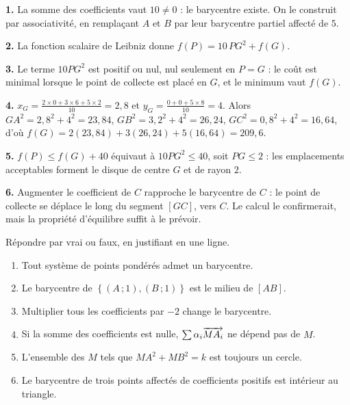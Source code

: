 \begin{corrige}
\textbf{1.} La somme des coefficients vaut $10 \neq 0$ : le barycentre existe.
On le construit par associativité, en remplaçant $A$ et $B$ par leur
barycentre partiel affecté de $5$.

\textbf{2.} La fonction scalaire de Leibniz donne
$f(P) = 10\,PG^{2}+f(G)$.

\textbf{3.} Le terme $10PG^{2}$ est positif ou nul, nul seulement en $P = G$ :
le coût est minimal lorsque le point de collecte est placé en $G$, et le
minimum vaut $f(G)$.

\textbf{4.} $x_{G} = \frac{2 \times 0+3 \times 6+5 \times 2}{10} = 2{,}8$ et
$y_{G} = \frac{0+0+5 \times 8}{10} = 4$. Alors
$GA^{2} = 2{,}8^{2}+4^{2} = 23{,}84$,
$GB^{2} = 3{,}2^{2}+4^{2} = 26{,}24$,
$GC^{2} = 0{,}8^{2}+4^{2} = 16{,}64$, d'où
$f(G) = 2(23{,}84)+3(26{,}24)+5(16{,}64) = 209{,}6$.

\textbf{5.} $f(P) \leq f(G)+40$ équivaut à $10PG^{2} \leq 40$, soit
$PG \leq 2$ : les emplacements acceptables forment le disque de centre $G$ et
de rayon $2$.

\textbf{6.} Augmenter le coefficient de $C$ rapproche le barycentre de $C$ :
le point de collecte se déplace le long du segment $[GC]$, vers $C$. Le
calcul le confirmerait, mais la propriété d'équilibre suffit à le prévoir.
\end{corrige}

\begin{jemeteste}
Répondre par vrai ou faux, en justifiant en une ligne.

\begin{enumerate}[label=\textbf{\arabic*.}, leftmargin=*, itemsep=0.28em]
  \item Tout système de points pondérés admet un barycentre.
  \item Le barycentre de $\left\{(A\,;1),(B\,;1)\right\}$ est le milieu de
        $[AB]$.
  \item Multiplier tous les coefficients par $-2$ change le barycentre.
  \item Si la somme des coefficients est nulle,
        $\sum \alpha_{i}\overrightarrow{MA_{i}}$ ne dépend pas de $M$.
  \item L'ensemble des $M$ tels que $MA^{2}+MB^{2} = k$ est toujours un
        cercle.
  \item Le barycentre de trois points affectés de coefficients positifs est
        intérieur au triangle.
\end{enumerate}
\end{jemeteste}

